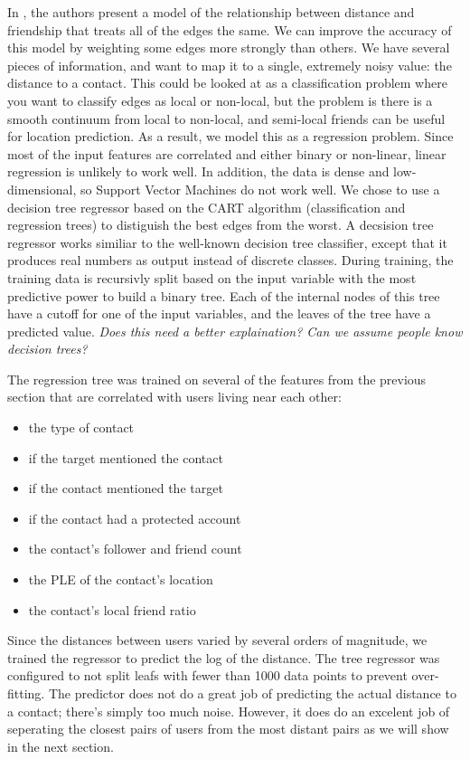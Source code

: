 In \cite{backstrom2010find}, the authors present a model of the relationship
between distance and friendship that treats all of the edges the same.
%
We can improve the accuracy of this model by weighting some edges more strongly
than others.
%
We have several pieces of information, and want to map it to a single, extremely
noisy value: the distance to a contact.
%
This could be looked at as a classification problem where you want to classify
edges as local or non-local, but the problem is there is a smooth continuum
from local to non-local, and semi-local friends can be useful for location
prediction.
%
As a result, we model this as a regression problem.
%
Since most of the input features are correlated and either binary or non-linear,
linear regression is unlikely to work well.
%
In addition, the data is dense and low-dimensional, so Support Vector Machines
do not work well.
%
We chose to use a decision tree regressor based on the CART algorithm
(classification and regression trees) to distiguish the best edges from the
worst.
%
A decsision tree regressor works similiar to the well-known decision tree
classifier, except that it produces real numbers as output instead of discrete
classes.
%
During training, the training data is recursivly split based on the input
variable with the most predictive power to build a binary tree.
%
Each of the internal nodes of this tree have a cutoff for one of the input
variables, and the leaves of the tree have a predicted value.
%
\emph{Does this need a better explaination? Can we assume people know decision
trees?}

The regression tree was trained on several of the features from the previous
section that are correlated with users living near each other:
\begin{itemize}
\item the type of contact
\item if the target mentioned the contact
\item if the contact mentioned the target
\item if the contact had a protected account
\item the contact's follower and friend count
\item the PLE of the contact's location
\item the contact's local friend ratio
\end{itemize}
%
Since the distances between users varied by several orders of magnitude, we
trained the regressor to predict the log of the distance.
%
The tree regressor was configured to not split leafs with fewer than 1000 data
points to prevent over-fitting.
%
The predictor does not do a great job of predicting the actual distance to a
contact; there's simply too much noise.
%
However, it does do an excelent job of seperating the closest pairs of users
from the most distant pairs as we will show in the next section.



